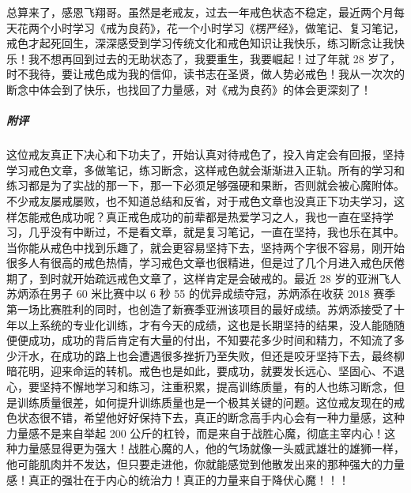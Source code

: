 \begin{case}
    总算来了，感恩飞翔哥。虽然是老戒友，过去一年戒色状态不稳定，最近两个月每天花两个小时学习《戒为良药》，花一个小时学习《楞严经》，做笔记、复习笔记，戒色才起死回生，深深感受到学习传统文化和戒色知识让我快乐，练习断念让我快乐！我不想再回到过去的无助状态了，我要重生，我要崛起！过了年就 28 岁了，时不我待，要让戒色成为我的信仰，读书志在圣贤，做人势必戒色！我从一次次的断念中体会到了快乐，也找回了力量感，对《戒为良药》的体会更深刻了！
    \subparagraph{附评} 这位戒友真正下决心和下功夫了，开始认真对待戒色了，投入肯定会有回报，坚持学习戒色文章，多做笔记，练习断念，这样戒色就会渐渐进入正轨。所有的学习和练习都是为了实战的那一下，那一下必须足够强硬和果断，否则就会被心魔附体。不少戒友屡戒屡败，也不知道总结和反省，对于戒色文章也没真正下功夫学习，这样怎能戒色成功呢？真正戒色成功的前辈都是热爱学习之人，我也一直在坚持学习，几乎没有中断过，不是看文章，就是复习笔记，一直在坚持，我也乐在其中。当你能从戒色中找到乐趣了，就会更容易坚持下去，坚持两个字很不容易，刚开始很多人有很高的戒色热情，学习戒色文章也很精进，但是过了几个月进入戒色厌倦期了，到时就开始疏远戒色文章了，这样肯定是会破戒的。最近 28 岁的亚洲飞人苏炳添在男子 60 米比赛中以 6 秒 55 的优异成绩夺冠，苏炳添在收获 2018 赛季第一场比赛胜利的同时，也创造了新赛季亚洲该项目的最好成绩。苏炳添接受了十年以上系统的专业化训练，才有今天的成绩，这也是长期坚持的结果，没人能随随便便成功，成功的背后肯定有大量的付出，不知要花多少时间和精力，不知流了多少汗水，在成功的路上也会遭遇很多挫折乃至失败，但还是咬牙坚持下去，最终柳暗花明，迎来命运的转机。戒色也是如此，要成功，就要发长远心、坚固心、不退心，要坚持不懈地学习和练习，注重积累，提高训练质量，有的人也练习断念，但是训练质量很差，如何提升训练质量也是一个极其关键的问题。这位戒友现在的戒色状态很不错，希望他好好保持下去，真正的断念高手内心会有一种力量感，这种力量感不是来自举起 200 公斤的杠铃，而是来自于战胜心魔，彻底主宰内心！这种力量感显得更为强大！战胜心魔的人，他的气场就像一头威武雄壮的雄狮一样，他可能肌肉并不发达，但只要走进他，你就能感觉到他散发出来的那种强大的力量感！真正的强壮在于内心的统治力！真正的力量来自于降伏心魔！！！
\end{case}


